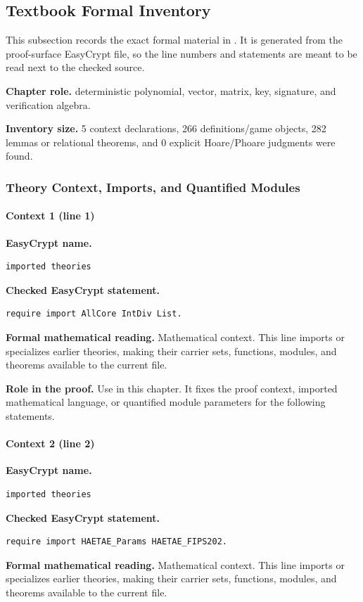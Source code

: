 \subsection*{Textbook Formal Inventory}
This subsection records the exact formal material in .  It is generated from the proof-surface EasyCrypt file, so the line numbers and statements are meant to be read next to the checked source.

\noindent\textbf{Chapter role.} deterministic polynomial, vector, matrix, key, signature, and verification algebra.

\noindent\textbf{Inventory size.} 5 context declarations, 266 definitions/game objects, 282 lemmas or relational theorems, and 0 explicit Hoare/Phoare judgments were found.

\subsubsection*{Theory Context, Imports, and Quantified Modules}
\paragraph{Context 1 (line 1)}
\noindent\textbf{EasyCrypt name.}
\begin{lstlisting}[language=EasyCrypt,basicstyle=\ttfamily\scriptsize]
imported theories
\end{lstlisting}
\noindent\textbf{Checked EasyCrypt statement.}
\begin{lstlisting}[language=EasyCrypt,basicstyle=\ttfamily\scriptsize]
require import AllCore IntDiv List.
\end{lstlisting}
\noindent\textbf{Formal mathematical reading.}
Mathematical context. This line imports or specializes earlier theories, making their carrier sets, functions, modules, and theorems available to the current file.

\noindent\textbf{Role in the proof.}
Use in this chapter. It fixes the proof context, imported mathematical language, or quantified module parameters for the following statements.

\paragraph{Context 2 (line 2)}
\noindent\textbf{EasyCrypt name.}
\begin{lstlisting}[language=EasyCrypt,basicstyle=\ttfamily\scriptsize]
imported theories
\end{lstlisting}
\noindent\textbf{Checked EasyCrypt statement.}
\begin{lstlisting}[language=EasyCrypt,basicstyle=\ttfamily\scriptsize]
require import HAETAE_Params HAETAE_FIPS202.
\end{lstlisting}
\noindent\textbf{Formal mathematical reading.}
Mathematical context. This line imports or specializes earlier theories, making their carrier sets, functions, modules, and theorems available to the current file.

